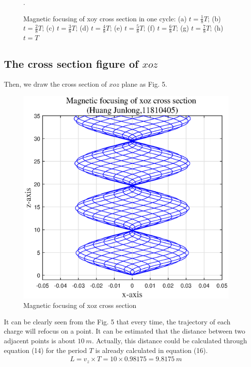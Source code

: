 \documentclass[journal,twocolumn,letterpaper]{IEEEJERM}
\begin{document}
\begin{figure}[H]
	\label{4f}
	\label{4g}
	\label{4h}
	\caption{Magnetic focusing of xoy cross section in one cycle: (a) $ t=\frac{1}{8}T $; (b) $ t=\frac{2}{8}T $; (c) $ t=\frac{3}{8}T $; (d) $ t=\frac{4}{8}T $; (e) $ t=\frac{5}{8}T $; (f) $ t=\frac{6}{8}T $; (g) $ t=\frac{7}{8}T $; (h) $ t=T $}.	  
	\label{fig4} 
\end{figure}


\subsection{The cross section figure of $ xoz $}
Then, we draw the cross section of $ xoz $ plane as Fig. 5.
\begin{figure}[H]   
	\centering	        \includegraphics[width=0.6\linewidth]{Fig-5-1.eps}
	\caption{Magnetic focusing of xoz cross section}	  
	\label{fig5} 
\end{figure}

It can be clearly seen from the Fig. 5 that every time, the trajectory of each charge will refocus on a point. It can be estimated that the distance between two adjacent points is about $ 10\ m $. Actually, this distance could be calculated through equation (14) for the period $ T $ is already calculated in equation (16).
\begin{align}
L=v_z\times T=10\times 0.98175=9.8175\ m
\end{align}
\end{document}
